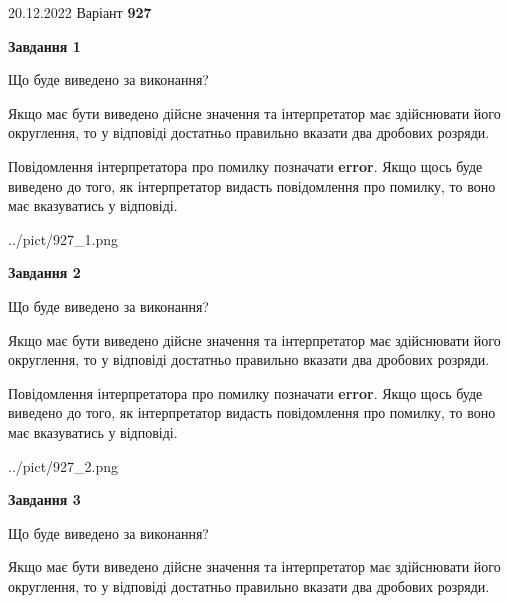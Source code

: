 \documentclass[12pt, ukrainian]{article}
\begin{document}
{20.12.2022 Варіант \No \textbf { 927 }\par}
{
\begin {Large}

{\begin {center}\textbf{Завдання 1}\end {center}}\par
Що буде виведено за виконання? \par

Якщо має бути виведено дійсне значення та інтерпретатор має здійснювати його округлення, 
то у відповіді достатньо правильно вказати два дробових розряди.

Повідомлення інтерпретатора про помилку позначати \textbf{error}.
Якщо щось буде виведено до того, як інтерпретатор видасть повідомлення про помилку, 
то воно має вказуватись у відповіді. \par

\begin{center}
	{../pict/927_1.png}
\end{center}
\newpage

{\begin {center}\textbf{Завдання 2}\end {center}}\par
Що буде виведено за виконання? \par

Якщо має бути виведено дійсне значення та інтерпретатор має здійснювати його округлення, 
то у відповіді достатньо правильно вказати два дробових розряди.

Повідомлення інтерпретатора про помилку позначати \textbf{error}.
Якщо щось буде виведено до того, як інтерпретатор видасть повідомлення про помилку, 
то воно має вказуватись у відповіді. \par

\begin{center}
	{../pict/927_2.png}
\end{center}
\newpage

{\begin {center}\textbf{Завдання 3}\end {center}}\par
Що буде виведено за виконання? \par

Якщо має бути виведено дійсне значення та інтерпретатор має здійснювати його округлення, 
то у відповіді достатньо правильно вказати два дробових розряди.


\end{Large}}
\end{document}
